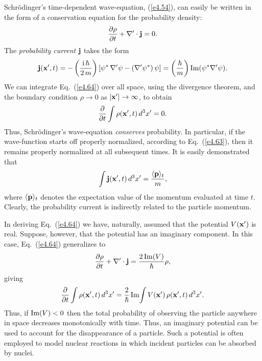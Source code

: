 Schr\"{o}dinger's time-dependent wave-equation, (\ref{e4.54}), can easily be
written in the form of a conservation equation for the probability
density:
\begin{equation}\label{e4.64}
\frac{\partial \rho}{\partial t} + \nabla'\cdot {\bf j} = 0.
\end{equation}
The {\em probability
current}\/ ${\bf j}$ takes the form
\begin{equation}\label{e4.65}
{\bf j}({\bf x}', t) = - \left(\frac{{\rm i}\, \hbar}{2\,m}\right)
\left[ \psi^\ast\, \nabla' \psi - (\nabla' \psi^\ast)\,\psi\right]
= \left(\frac{\hbar}{m} \right){\rm Im} (\psi^\ast \nabla' \psi).
\end{equation}
We can integrate Eq.~(\ref{e4.64}) over all space, using the divergence theorem,
and the boundary condition $\rho\rightarrow 0$ as $|{\bf x'}|\rightarrow
\infty$, to obtain 
\begin{equation}
\frac{\partial}{\partial t} \int \rho({\bf x'}, t)\, d^3 x' = 0.
\end{equation}
Thus, Schr\"{o}dinger's wave-equation {\em  conserves}\/
 probability. In particular, if the
wave-function starts off properly normalized, according to Eq.~(\ref{e4.63}), then it
remains properly normalized at all subsequent times. It is easily
demonstrated that
\begin{equation}
\int {\bf j}({\bf x}', t) \,d^3 x' = \frac{\langle {\bf p }\rangle_t}{m},
\end{equation}
where $\langle {\bf p} \rangle_t$ denotes the expectation value of the momentum
evaluated at time $t$.  Clearly, the probability current is indirectly related to
the particle momentum.

In deriving Eq.~(\ref{e4.64}) we have, naturally, assumed that the potential $V({\bf x}')$
is real. Suppose, however, that the potential has an imaginary component. 
In this case, Eq.~(\ref{e4.64}) generalizes to
\begin{equation}
\frac{\partial \rho}{\partial t} + \nabla'\cdot {\bf j} = \frac{2\,{\rm Im}(V)}{\hbar}
\rho,
\end{equation}
giving
\begin{equation}
\frac{\partial}{\partial t} \int \rho({\bf x'}, t)\, d^3 x' = \frac{2}{\hbar}\,
{\rm Im}\!\int
V({\bf x}') \,\rho({\bf x'}, t)\, d^3 x'.
\end{equation}
Thus, if ${\rm Im}(V)<0$ then the total probability of observing the particle
anywhere in space 
decreases monotonically with time. Thus, an imaginary potential can be
used to account for the disappearance of a particle. Such a potential
is often employed to model nuclear reactions in which incident particles can be
absorbed by nuclei.

